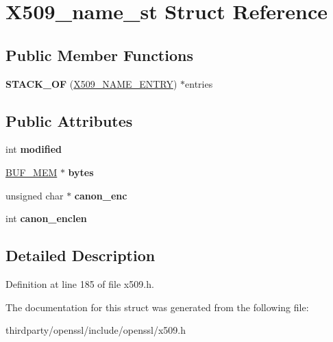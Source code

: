 \hypertarget{struct_x509__name__st}{}\section{X509\+\_\+name\+\_\+st Struct Reference}
\label{struct_x509__name__st}
\subsection*{Public Member Functions}
\begin{DoxyCompactItemize}
\item 
\mbox{\label{struct_x509__name__st_a1a96008fa7f511e0836cf506e14ee1eb}} 
{\bfseries S\+T\+A\+C\+K\+\_\+\+OF} (\hyperlink{struct_x509__name__entry__st}{X509\+\_\+\+N\+A\+M\+E\+\_\+\+E\+N\+T\+RY}) $\ast$entries
\end{DoxyCompactItemize}
\subsection*{Public Attributes}
\begin{DoxyCompactItemize}
\item 
\mbox{\label{struct_x509__name__st_a1bbfbc394e6971bc55d4f9ec4c22ae44}} 
int {\bfseries modified}
\item 
\mbox{\label{struct_x509__name__st_a673c31a6033851f510b2e74770f43224}} 
\hyperlink{structbuf__mem__st}{B\+U\+F\+\_\+\+M\+EM} $\ast$ {\bfseries bytes}
\item 
\mbox{\label{struct_x509__name__st_af5bcedafa7eb3039090945fec07a0ed7}} 
unsigned char $\ast$ {\bfseries canon\+\_\+enc}
\item 
\mbox{\label{struct_x509__name__st_a264a0973bed1cf3905e3f12b5af1d269}} 
int {\bfseries canon\+\_\+enclen}
\end{DoxyCompactItemize}


\subsection{Detailed Description}


Definition at line 185 of file x509.\+h.



The documentation for this struct was generated from the following file\+:\begin{DoxyCompactItemize}
\item 
thirdparty/openssl/include/openssl/x509.\+h\end{DoxyCompactItemize}
